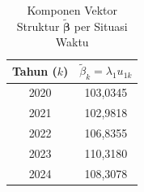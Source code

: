 \begin{table}[H]
\centering
\small
\caption{Komponen Vektor Struktur $\tilde{\boldsymbol{\beta}}$ per Situasi Waktu} \label{tab:app1beta_vec}
\begin{tabular}{|c|c|}
\hline
\textbf{Tahun ($k$)} & \textbf{$\tilde{\beta}_k = \lambda_1 u_{1k}$} \\
\hline
2020 & 103,0345 \\
2021 & 102,9818 \\
2022 & 106,8355 \\
2023 & 110,3180 \\
2024 & 108,3078 \\
\hline
\end{tabular}
\end{table}